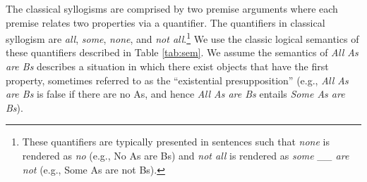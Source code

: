 \documentclass[floatsintext, doc]{apa6}
\newcommand{\mht}[1]{{\textcolor{Blue}{[mht: #1]}}}
\begin{document}




The classical syllogisms are comprised by two premise arguments where each premise relates two properties via a quantifier. 
The quantifiers in classical syllogism are \emph{all}, \emph{some}, \emph{none}, and \emph{not all}.\footnote{
These quantifiers are typically presented in sentences such that \emph{none} is rendered as \emph{no} (e.g., No As are Bs) and \emph{not all} is rendered as \emph{some \_\_ are not} (e.g., Some As are not Bs).
}
We use the classic logical semantics of these quantifiers described in Table \ref{tab:sem}.
We assume the semantics of \emph{All As are Bs} describes a situation in which there exist objects that have the first property, sometimes referred to as the ``existential presupposition'' (e.g., \emph{All As are Bs} is false if there are no As, and hence \emph{All As are Bs} entails \emph{Some As are Bs}). 


\end{document}
